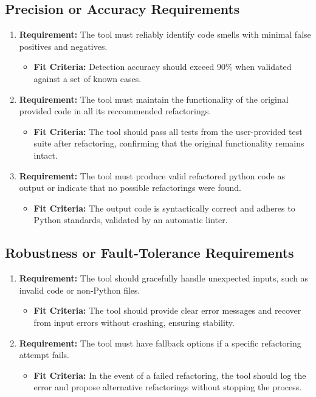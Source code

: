 \documentclass[12pt]{article}
\begin{document}
\subsection{Precision or Accuracy Requirements}
\begin{enumerate}
  \item \textbf{Requirement:} The tool must reliably identify code smells with minimal false positives and negatives.
  \begin{itemize}[label={}]
      \item \textbf{Fit Criteria:} Detection accuracy should exceed 90\% when validated against a set of known cases.
  \end{itemize}
  \item \textbf{Requirement:} The tool must maintain the functionality of the original provided code in all its reccommended refactorings.
  \begin{itemize}[label={}]
      \item \textbf{Fit Criteria:} The tool should pass all tests from the user-provided test suite after refactoring, confirming that the original functionality remains intact.
  \end{itemize}
  \item \textbf{Requirement:} The tool must produce valid refactored python code as output or indicate that no possible refactorings were found.
  \begin{itemize}[label={}]
      \item \textbf{Fit Criteria:} The output code is syntactically correct and adheres to Python standards, validated by an automatic linter.
  \end{itemize}
\end{enumerate}
\subsection{Robustness or Fault-Tolerance Requirements}
\begin{enumerate}
  \item \textbf{Requirement:} The tool should gracefully handle unexpected inputs, such as invalid code or non-Python files.
  \begin{itemize}[label={}]
      \item \textbf{Fit Criteria:} The tool should provide clear error messages and recover from input errors without crashing, ensuring stability.
  \end{itemize}
  \item \textbf{Requirement:} The tool must have fallback options if a specific refactoring attempt fails.
  \begin{itemize}[label={}]
      \item \textbf{Fit Criteria:} In the event of a failed refactoring, the tool should log the error and propose alternative refactorings without stopping the process.
  \end{itemize}
\end{enumerate}
\end{document}
